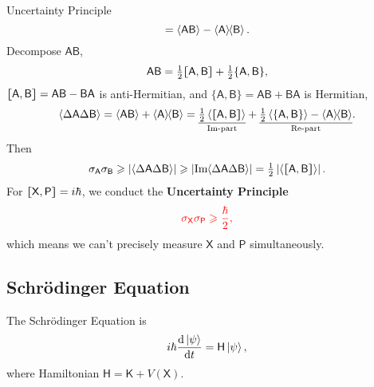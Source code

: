 \documentclass{article}
\def\d{{\rm d}}
\def\sA{\mathsf A}\def\sB{\mathsf B}\def\sC{\mathsf C}\def\sX{\mathsf X}\def\sP{\mathsf P}\def\sH{\mathsf H}\def\sK{\mathsf K}\def\sL{\mathsf L}\def\sS{\mathsf S}\def\sM{\mathsf M}\def\sT{\mathsf T}
\newcommand{\ko}[1]{\hspace{-#1 pt}}%
\newcommand{\ds}[2]{\frac{\d #1}{\d #2}}%
\newcommand{\ave}[1]{\left\langle #1\right\rangle}%
\newcommand{\ket}[1]{\left\vert #1\right\rangle}
\newcommand{\cmm}[1]{\lfloor\ko{4.45}\lceil #1\rceil\ko{4.45}\rfloor}%
\newcommand{\spark}[1]{\textcolor{red}{#1}}
\begin{document}
\begin{theorem}{Uncertainty Principle}{}
$$		=\ave{\sA\sB}-\ave\sA\ko3\ave\sB.$$
	Decompose $\sA\sB$,
	$$\sA\sB=\textstyle\frac12\cmm{\sA,\sB}+\frac12\{\sA,\sB\},$$
	$\cmm{\sA,\sB}=\sA\sB-\sB\sA$ is anti-Hermitian, and $\{\sA,\sB\}=\sA\sB+\sB\sA$ is Hermitian,
	$$\ave{\Delta\sA\Delta\sB}=\ave{\sA\sB}+\ave\sA\ko3\ave\sB=\underset{\text{Im-part}}{\underline{\textstyle\frac12\ave{\cmm{\sA,\sB}}}}+\underset{\text{Re-part}}{\underline{\textstyle\frac12\ave{\{\sA,\sB\}}-\ave\sA\ko3\ave\sB}}.$$
	Then
	$$\sigma_\sA\sigma_\sB\geqslant\left|\ave{\Delta\sA\Delta\sB}\right|\geqslant\left|\text{Im}\ko2\ave{\Delta\sA\Delta\sB}\right|=\textstyle\frac12\left|\ave{\cmm{\sA,\sB}}\right|.$$
	For $\cmm{\sX,\sP}=i\hbar$, we conduct the \textbf{Uncertainty Principle}
	$$\spark{\sigma_\sX\sigma_\sP\geqslant\frac{\hbar}2,}$$
	which means we can't precisely measure $\sX$ and $\sP$ simultaneously.
\end{theorem}
\subsection{Schrödinger Equation}
The Schrödinger Equation is
\spark{\begin{align}\label{vectdse}
		i\hbar\ds{\ket\psi}t=\sH\ket\psi,
	\end{align}}
where Hamiltonian $\sH=\sK+V(\sX)$.
\end{document}
